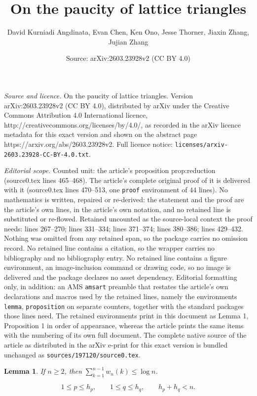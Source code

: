\documentclass[10pt,a4paper]{amsart}
\title{On the paucity of lattice triangles}
\author{David Kurniadi Angdinata, Evan Chen, Ken Ono, Jesse Thorner, Jiaxin Zhang, Jujian Zhang}
\date{Source: arXiv:2603.23928v2 (CC BY 4.0)}
\newtheorem{lemma}{Lemma}
\begin{document}
\maketitle

\noindent\emph{Source and licence.} On the paucity of lattice triangles. Version arXiv:2603.23928v2 (CC BY 4.0), distributed by arXiv under the Creative Commons Attribution 4.0 International licence, http://creativecommons.org/licenses/by/4.0/, as recorded in the arXiv licence metadata for this exact version and shown on the abstract page https://arxiv.org/abs/2603.23928v2. Full licence notice: \texttt{licenses/arxiv-2603.23928-CC-BY-4.0.txt}.\par\smallskip

\noindent\textit{Editorial scope.} Counted unit: the article's proposition prop:reduction (source0.tex lines 465--468). The article's complete original proof of it is delivered with it (source0.tex lines 470--513, one \texttt{proof} environment of 44 lines). No mathematics is written, repaired or re-derived: the statement and the proof are the article's own lines, in the article's own notation, and no retained line is substituted or re-flowed.  Retained uncounted as the source-local context the proof needs: lines 267--270; lines 331--334; lines 371--374; lines 380--386; lines 429--432.  Nothing was omitted from any retained span, so the package carries no omission record.  No retained line contains a citation, so the wrapper carries no bibliography and no bibliography entry.  No retained line contains a figure environment, an image-inclusion command or drawing code, so no image is delivered and the package declares no asset dependency.  Editorial formatting only, in addition: an AMS \texttt{amsart} preamble that restates the article's own declarations and macros used by the retained lines, namely the environments \texttt{lemma}, \texttt{proposition} on separate counters, together with the standard packages those lines need.  The retained environments print in this document as Lemma 1, Proposition 1 in order of appearance, whereas the article prints the same items with the numbering of its own full document.  The complete native source of the article as distributed in the arXiv e-print for this exact version is bundled unchanged as \texttt{sources/197120/source0.tex}.
\begin{lemma}
\label{lem:harmonic}
If $n\ge 2$, then $\sum_{k=1}^{n-1}w_n(k)\le \log n$.
\end{lemma}

\begin{equation}
\label{eqn:hsum}
1\le p\le h_p,\qquad 1\le q\le h_q,\qquad h_p+h_q<n.
\end{equation}
\end{document}
